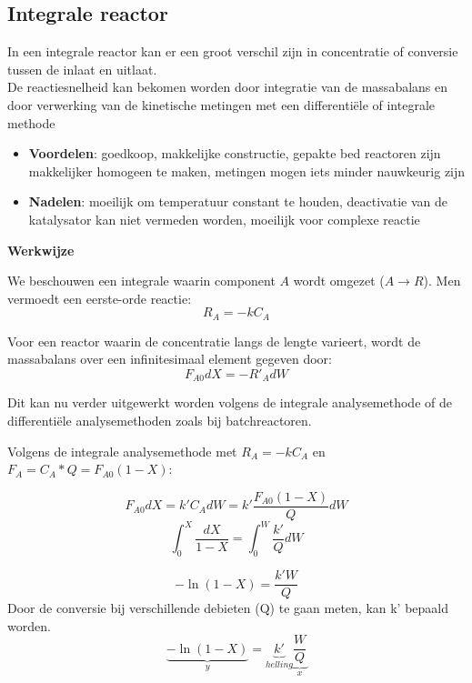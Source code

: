 \documentclass{ximera}
\begin{document}
\subsection*{Integrale reactor}

In een integrale reactor kan er een groot verschil zijn in concentratie of conversie tussen de inlaat en uitlaat. \\
De reactiesnelheid kan bekomen worden door integratie van de massabalans en door verwerking van de kinetische metingen met een differentiële of integrale methode

\begin{center}
\end{center}

\begin{itemize}
    \item \textbf{Voordelen}: goedkoop, makkelijke constructie, gepakte bed reactoren zijn makkelijker homogeen te maken, metingen mogen iets minder nauwkeurig zijn
    \item \textbf{Nadelen}: moeilijk om temperatuur constant te houden, deactivatie van de katalysator kan niet vermeden worden, moeilijk voor complexe reactie 
\end{itemize}

\textbf{Werkwijze}

We beschouwen een integrale waarin component $A$ wordt omgezet ($A \rightarrow R$). Men vermoedt een eerste-orde reactie:
\[
R_A = -k C_A
\]

Voor een reactor waarin de concentratie langs de lengte varieert, wordt de massabalans over een infinitesimaal element gegeven door:
\[
F_{A0}dX = -R'_AdW
\]

Dit kan nu verder uitgewerkt worden volgens de integrale analysemethode of de differentiële analysemethoden zoals bij batchreactoren.

Volgens de integrale analysemethode met $R_A = -k C_A$ en $F_{A} = C_{A}*Q = F_{A0}(1-X)$:

\[
F_{A0}dX = k'C_AdW = k'\frac{F_{A0}(1-X)}{Q}dW
\]
\[
\int_0^X \frac{dX}{1 - X} = \int_0^W \frac{k'}{Q}dW
\]

\[
-\ln(1 - X) = \frac{k' W}{Q}
\]
Door de conversie bij verschillende debieten (Q) te gaan meten, kan k' bepaald worden.
\[
\underbrace{-\ln(1 - X)}_{y} = \underbrace{k'}_{helling} \underbrace{\frac{W}{Q}}_{x}
\]
\end{document}
